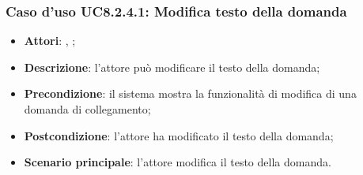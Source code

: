 	\subsubsection{Caso d'uso UC8.2.4.1: Modifica testo della domanda}
	\label{UC8.2.4.1}
	\begin{itemize}
		\item
		\textbf{Attori}: \uau, \uaupro;
		\item		
		\textbf{Descrizione}: l'attore può modificare il testo della domanda;
		\item
		\textbf{Precondizione}: il sistema mostra la funzionalità di modifica di una domanda di collegamento; 
		\item
		\textbf{Postcondizione}: l'attore ha modificato il testo della domanda;
		\item
		\textbf{Scenario principale}: l'attore modifica il testo della domanda.	
	\end{itemize}

